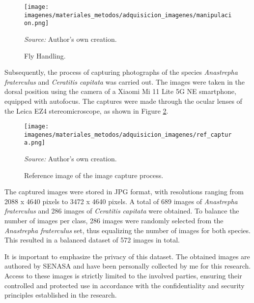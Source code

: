 \begin{figure}[htbp]
    \centering
    \texttt{[image: imagenes/materiales\_metodos/adquisicion\_imagenes/manipulacion.png]}
    \caption{Fly Handling.}
    \scriptsize \textit{Source:} Author's own creation. 
    \label{fig:manipulacion}
\end{figure}

Subsequently, the process of capturing photographs of the species \textit{Anastrepha fraterculus} and \textit{Ceratitis capitata} was carried out. The images were taken in the dorsal position using the camera of a Xiaomi Mi 11 Lite 5G NE smartphone, equipped with autofocus. The captures were made through the ocular lenses of the Leica EZ4 stereomicroscope, as shown in Figure \ref{fig:refcapturaimagen}.

\begin{figure}[htbp]
    \centering
    \texttt{[image: imagenes/materiales\_metodos/adquisicion\_imagenes/ref\_captura.png]}
    \caption{Reference image of the image capture process.}
    \scriptsize \textit{Source:} Author's own creation.
    \label{fig:refcapturaimagen}
\end{figure}

The captured images were stored in JPG format, with resolutions ranging from 2088 x 4640 pixels to 3472 x 4640 pixels. A total of 689 images of \textit{Anastrepha fraterculus} and 286 images of \textit{Ceratitis capitata} were obtained. To balance the number of images per class, 286 images were randomly selected from the \textit{Anastrepha fraterculus} set, thus equalizing the number of images for both species. This resulted in a balanced dataset of 572 images in total.

It is important to emphasize the privacy of this dataset. The obtained images are authored by SENASA and have been personally collected by me for this research. Access to these images is strictly limited to the involved parties, ensuring their controlled and protected use in accordance with the confidentiality and security principles established in the research.
 